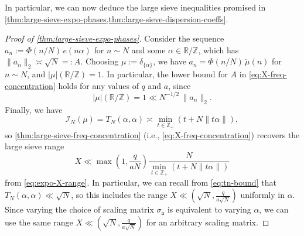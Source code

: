 \documentclass[reqno,11pt]{amsart}
\theoremstyle{remark}
\numberwithin{equation}{section}
\newcommand{\Z}{\mathbb{Z}}
\newcommand{\R}{\mathbb{R}}
\newcommand{\mI}{\mathcal{I}}
\newcommand{\ma}{\mathfrak{a}}
\begin{document}
In particular, we can now deduce the large sieve inequalities promised in \cref{thm:large-sieve-expo-phases,thm:large-sieve-dispersion-coeffs}.

\begin{proof}[Proof of \cref{thm:large-sieve-expo-phases}]
Consider the sequence $a_n := \Phi(n/N)\, e(n\alpha)$ for $n \sim N$ and some $\alpha \in \R/\Z$, which has $\|a_n\|_2 \asymp \sqrt{N} =: A$. Choosing $\mu := \delta_{\{\alpha\}}$, we have $a_n = \Phi(n/N)\, \check{\mu}(n)$ for $n \sim N$, and $|\mu|(\R/\Z) = 1$. In particular, the lower bound for $A$ in \cref{eq:X-freq-concentration} holds for any values of $q$ and $a$, since
\[
    |\mu|(\R/\Z) = 1 \ll N^{-1/2}\, \|a_n\|_2.
\]
Finally, we have
\[
    \mI_{N}(\mu) = T_N(\alpha, \alpha) \asymp \min_{t \in \Z_+} \left(t + N\|t\alpha\|\right),
\]
so \cref{thm:large-sieve-freq-concentration} (i.e., \cref{eq:X-freq-concentration}) recovers the large sieve range
\[
    X \ll \max\left(1, \frac{q}{aN}\right) \frac{N}{\min_{t \in \Z_+} \left(t + N\|t\alpha\|\right)}
\]
from \cref{eq:expo-X-range}. In particular, we can recall from \cref{eq:tn-bound} that $T_N(\alpha, \alpha) \ll \sqrt{N}$, so this includes the range $X \ll (\sqrt{N}, \tfrac{q}{a\sqrt{N}})$ uniformly in $\alpha$. Since varying the choice of scaling matrix $\sigma_{\ma}$ is equivalent to varying $\alpha$, we can use the same range $X \ll (\sqrt{N}, \tfrac{q}{a\sqrt{N}})$ for an arbitrary scaling matrix.
\end{proof}
\end{document}
